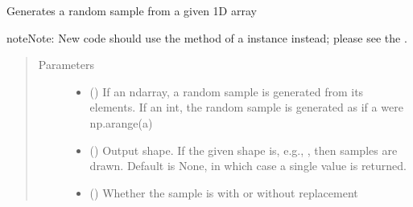 \documentclass[letterpaper,10pt,english]{sphinxmanual}
\begin{document}
\begin{fulllineitems}
\label{\detokenize{source/yawning_titan.envs.generic.core:yawning_titan.envs.generic.core.network_interface.choice}}
\sphinxAtStartPar
Generates a random sample from a given 1\sphinxhyphen{}D array

\sphinxAtStartPar
{}

\begin{sphinxadmonition}{note}{Note:}
\sphinxAtStartPar
New code should use the  method of a 
instance instead; please see the .
\end{sphinxadmonition}
\begin{quote}\begin{description}
\item[{Parameters}] \leavevmode\begin{itemize}
\item {}
\sphinxAtStartPar
{} () \textendash{} If an ndarray, a random sample is generated from its elements.
If an int, the random sample is generated as if a were np.arange(a)

\item {}
\sphinxAtStartPar
{} (\sphinxstyleliteralemphasis{\sphinxupquote{, }}) \textendash{} Output shape.  If the given shape is, e.g., , then
 samples are drawn.  Default is None, in which case a
single value is returned.

\item {}
\sphinxAtStartPar
{} (\sphinxstyleliteralemphasis{\sphinxupquote{, }}) \textendash{} Whether the sample is with or without replacement


\end{itemize}
\end{description}
\end{quote}
\end{fulllineitems}
\end{document}

